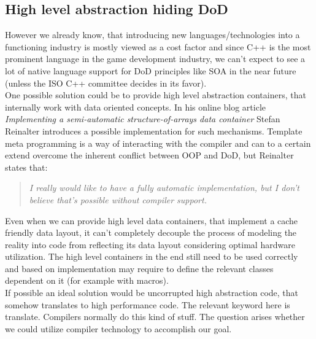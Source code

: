 \subsection{High level abstraction hiding DoD}
However we already know, that introducing new languages/technologies into a functioning industry is mostly viewed as a cost factor and since C++ is the most prominent language in the game development industry, we can't expect to see a lot of native language support for DoD principles like SOA in the near future (unless the ISO C++ committee decides in its favor).\\
One possible solution could be to provide high level abstraction containers, that internally work with data oriented concepts. In his online blog article \textit{Implementing a semi-automatic structure-of-arrays data container}  Stefan Reinalter introduces a possible implementation for such mechanisms. Template meta programming is a way of interacting with the compiler and can to a certain extend overcome the inherent conflict between OOP and DoD, but Reinalter states that:
\begin{quote}
	\textit{I really would like to have a fully automatic implementation, but I don’t believe that’s possible without compiler support.} 
\end{quote}
Even when we can provide high level data containers, that implement a cache friendly data layout, it can't completely decouple the process of modeling the reality into code from reflecting its data layout considering optimal hardware utilization. The high level containers in the end still need to be used correctly and based on implementation may require to define the relevant classes dependent on it (for example with macros).\\
If possible an ideal solution would be uncorrupted high abstraction code, that somehow translates to high performance code. The relevant keyword here is translate. Compilers normally do this kind of stuff. The question arises whether we could utilize compiler technology to accomplish our goal.